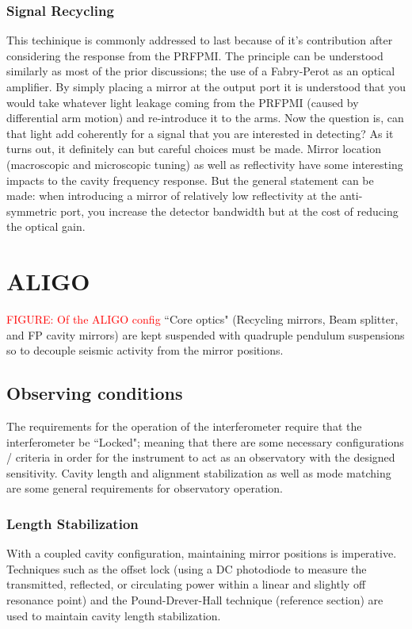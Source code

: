\subsubsection{Signal Recycling}
This techinique is commonly addressed to last because of it's contribution after considering the response from the PRFPMI. The principle can be understood similarly as most of the prior discussions; the use of a Fabry-Perot as an optical amplifier. By simply placing a mirror at the output port it is understood that you would take whatever light leakage coming from the PRFPMI (caused by differential arm motion) and re-introduce it to the arms. Now the question is, can that light add coherently for a signal that you are interested in detecting? As it turns out, it definitely can but careful choices must be made. Mirror location (macroscopic and microscopic tuning) as well as reflectivity have some interesting impacts to the cavity frequency response. But the general statement can be made: when introducing a mirror of relatively low reflectivity at the anti-symmetric port, you increase the detector bandwidth but at the cost of reducing the optical gain.


\section{ALIGO}
\textcolor{red}{FIGURE: Of the ALIGO config}
``Core optics" (Recycling mirrors, Beam splitter, and FP cavity mirrors) are kept suspended with quadruple pendulum suspensions so to decouple seismic activity from the mirror positions.

\subsection{Observing conditions}
The requirements for the operation of the interferometer require that the interferometer be  ``Locked"; meaning that there are some necessary configurations / criteria in order for the instrument to act as an observatory with the designed sensitivity. Cavity length and alignment stabilization as well as mode matching are some general requirements for observatory operation.

\subsubsection{Length Stabilization}
With a coupled cavity configuration, maintaining mirror positions is imperative. Techniques such as the offset lock (using a DC photodiode to measure the transmitted, reflected, or circulating power within a linear and slightly off resonance point) \cite{} and the Pound-Drever-Hall technique (reference section) are used to maintain cavity length stabilization.

